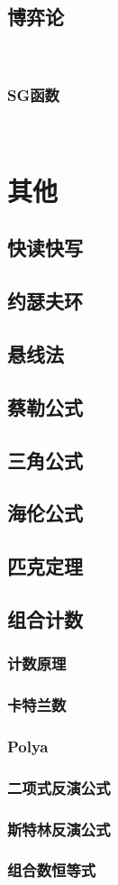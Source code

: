 \documentclass[twocolumn,a4]{article}
\newcommand{\addcpp}[1]{}
\begin{document}
	\subsection{博弈论}
​		\subsubsection{SG函数}
​			\addcpp{math/SG}
\section{其他}
	\subsection{快读快写}
	\subsection{约瑟夫环}
	\subsection{悬线法}
	\subsection{蔡勒公式}
	\subsection{三角公式}
	\subsection{海伦公式}
	\subsection{匹克定理}
	\subsection{组合计数}
		\subsubsection{计数原理}
		\subsubsection{卡特兰数}
		\subsubsection{Polya}
		\subsubsection{二项式反演公式}
		\subsubsection{斯特林反演公式}
		\subsubsection{组合数恒等式}
			
\end{document}
